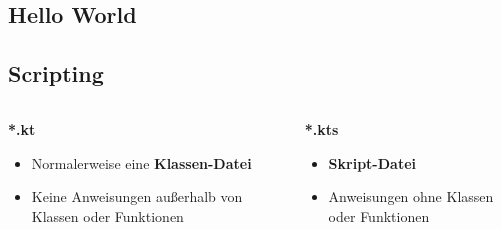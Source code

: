     \subsection{Hello World}\label{subsec:hello-world}
    \begin{frame}
        \slidehead
    \end{frame}

    \subsection{Scripting}\label{subsec:scripting}
    \begin{frame}
        \slidehead
        \begin{columns}[c]
            \begin{column}{.5\textwidth}
                \centering
                \Large
                \textbf{*.kt}
                \vspace{1em}
                \normalsize
                \begin{itemize}
                    \item Normalerweise eine \textbf{Klassen-Datei}
                    \item Keine Anweisungen außerhalb von Klassen oder Funktionen
                \end{itemize}
            \end{column}
            \begin{column}{.5\textwidth}
                \centering
                \Large
                \textbf{*.kts}
                \vspace{1em}
                \normalsize
                \begin{itemize}
                    \item \textbf{Skript-Datei}
                    \item Anweisungen ohne Klassen oder Funktionen
                \end{itemize}
            \end{column}
        \end{columns}
    \end{frame}

